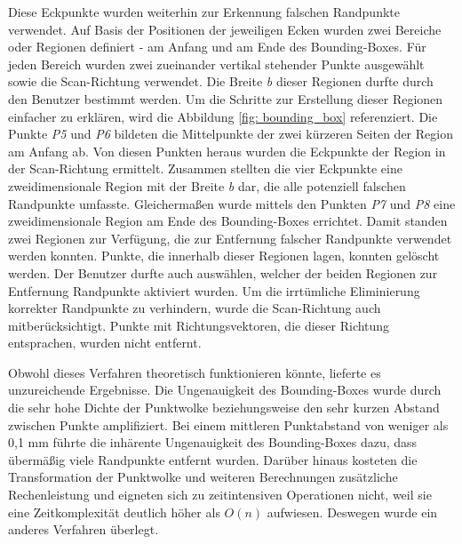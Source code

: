 Diese Eckpunkte wurden weiterhin zur Erkennung falschen Randpunkte verwendet. Auf Basis der Positionen der jeweiligen Ecken wurden zwei Bereiche oder Regionen definiert - am Anfang und am Ende des Bounding-Boxes. Für jeden Bereich wurden zwei zueinander vertikal stehender Punkte ausgewählt sowie die Scan-Richtung verwendet. Die Breite \textit{b} dieser Regionen durfte durch den Benutzer bestimmt werden. Um die Schritte zur Erstellung dieser Regionen einfacher zu erklären, wird die Abbildung \ref{fig: bounding_box} referenziert. Die Punkte \textit{P5} und \textit{P6} bildeten die Mittelpunkte der zwei kürzeren Seiten der Region am Anfang ab. Von diesen Punkten heraus wurden die Eckpunkte der Region in der Scan-Richtung ermittelt. Zusammen stellten die vier Eckpunkte eine zweidimensionale Region mit der Breite \textit{b} dar, die alle potenziell falschen Randpunkte umfasste. Gleichermaßen wurde mittels den Punkten \textit{P7} und \textit{P8} eine zweidimensionale Region am Ende des Bounding-Boxes errichtet. Damit standen zwei Regionen zur Verfügung, die zur Entfernung falscher Randpunkte verwendet werden konnten. Punkte, die innerhalb dieser Regionen lagen, konnten gelöscht werden. Der Benutzer durfte auch auswählen, welcher der beiden Regionen zur Entfernung Randpunkte aktiviert wurden. Um die irrtümliche Eliminierung korrekter Randpunkte zu verhindern, wurde die Scan-Richtung auch mitberücksichtigt. Punkte mit Richtungsvektoren, die dieser Richtung entsprachen, wurden nicht entfernt. 

Obwohl dieses Verfahren theoretisch funktionieren könnte, lieferte es unzureichende Ergebnisse. Die Ungenauigkeit des Bounding-Boxes wurde durch die sehr hohe Dichte der Punktwolke beziehungsweise den sehr kurzen Abstand zwischen Punkte amplifiziert. Bei einem mittleren Punktabstand von weniger als 0,1 mm führte die inhärente Ungenauigkeit des Bounding-Boxes dazu, dass übermäßig viele Randpunkte entfernt wurden. Darüber hinaus kosteten die Transformation der Punktwolke und weiteren Berechnungen zusätzliche Rechenleistung und eigneten sich zu zeitintensiven Operationen nicht, weil sie eine Zeitkomplexität deutlich höher als $O(n)$ aufwiesen. Deswegen wurde ein anderes Verfahren überlegt.

